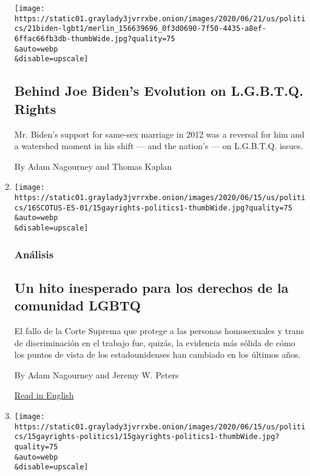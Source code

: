 \begin{enumerate}
  \texttt{[image: https://static01.graylady3jvrrxbe.onion/images/2020/06/21/us/politics/21biden-lgbt1/merlin\_156639696\_0f3d0690-7f50-4435-a8ef-6ffac66fb3db-thumbWide.jpg?quality=75\\\&auto=webp\\\&disable=upscale]}

  \hypertarget{behind-joe-bidens-evolution-on-lgbtq-rights}{%
  \subsection{Behind Joe Biden's Evolution on L.G.B.T.Q.
  Rights}\label{behind-joe-bidens-evolution-on-lgbtq-rights}}

  Mr. Biden's support for same-sex marriage in 2012 was a reversal for
  him and a watershed moment in his shift --- and the nation's --- on
  L.G.B.T.Q. issues.

  By Adam Nagourney and Thomas Kaplan
\item
  \href{/es/2020/06/17/espanol/derechos-lgbtq-corte-suprema.html}{}

  \texttt{[image: https://static01.graylady3jvrrxbe.onion/images/2020/06/15/us/politics/16SCOTUS-ES-01/15gayrights-politics1-thumbWide.jpg?quality=75\\\&auto=webp\\\&disable=upscale]}

  \hypertarget{anuxe1lisis}{%
  \subsubsection{Análisis}\label{anuxe1lisis}}

  \hypertarget{un-hito-inesperado-para-los-derechos-de-la-comunidad-lgbtq}{%
  \subsection{Un hito inesperado para los derechos de la comunidad
  LGBTQ}\label{un-hito-inesperado-para-los-derechos-de-la-comunidad-lgbtq}}

  El fallo de la Corte Suprema que protege a las personas homosexuales y
  trans de discriminación en el trabajo fue, quizás, la evidencia más
  sólida de cómo los puntos de vista de los estadounidenses han cambiado
  en los últimos años.

  By Adam Nagourney and Jeremy W. Peters

  \href{https://www.nytimes3xbfgragh.onion/2020/06/15/us/politics/supreme-court-lgbtq-rights.html}{Read
  in English}
\item
  \href{/2020/06/15/us/politics/supreme-court-lgbtq-rights.html}{}

  \texttt{[image: https://static01.graylady3jvrrxbe.onion/images/2020/06/15/us/politics/15gayrights-politics1/15gayrights-politics1-thumbWide.jpg?quality=75\\\&auto=webp\\\&disable=upscale]}


\end{enumerate}
